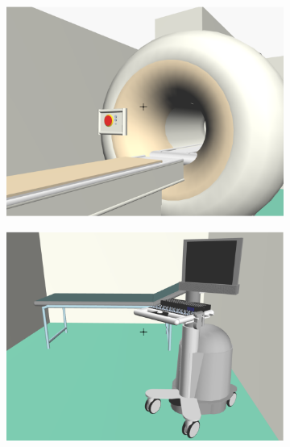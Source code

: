 \documentclass[]{egpubl}
\begin{document}
\begin{figure}[htbp]
\hspace{-1.5mm}   
   \begin{subfigure}[b]{0.165\textwidth}
   \includegraphics[width=\textwidth]{images/emergency/8}
   \end{subfigure}
\hspace{-1.5mm}   
   \begin{subfigure}[b]{0.165\textwidth}
   \includegraphics[width=\textwidth]{images/emergency/9}
   \end{subfigure}
\hspace{-1.5mm}   
   \begin{subfigure}[b]{0.165\textwidth}

\end{subfigure}
\end{figure}
\end{document}
